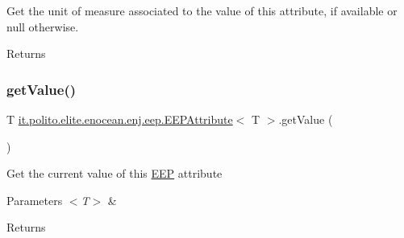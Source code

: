 Get the unit of measure associated to the value of this attribute, if available or null otherwise.

\begin{DoxyReturn}{Returns}

\end{DoxyReturn}
\hypertarget{classit_1_1polito_1_1elite_1_1enocean_1_1enj_1_1eep_1_1_e_e_p_attribute_a4e681931c6ba79eec202bb2fcb34f1ac}{}\label{classit_1_1polito_1_1elite_1_1enocean_1_1enj_1_1eep_1_1_e_e_p_attribute_a4e681931c6ba79eec202bb2fcb34f1ac} 
\subsubsection{\texorpdfstring{get\+Value()}{getValue()}}
{\footnotesize\ttfamily T \hyperlink{classit_1_1polito_1_1elite_1_1enocean_1_1enj_1_1eep_1_1_e_e_p_attribute}{it.\+polito.\+elite.\+enocean.\+enj.\+eep.\+E\+E\+P\+Attribute}$<$ T $>$.get\+Value (\begin{DoxyParamCaption}{ }\end{DoxyParamCaption})}

Get the current value of this \hyperlink{classit_1_1polito_1_1elite_1_1enocean_1_1enj_1_1eep_1_1_e_e_p}{E\+EP} attribute


\begin{DoxyParams}{Parameters}
{\em $<$\+T$>$} & \\
\hline
\end{DoxyParams}
\begin{DoxyReturn}{Returns}

\end{DoxyReturn}
\hypertarget{classit_1_1polito_1_1elite_1_1enocean_1_1enj_1_1eep_1_1_e_e_p_attribute_ae3c284089a4cc226b48fa283068d42cf}{}\label{classit_1_1polito_1_1elite_1_1enocean_1_1enj_1_1eep_1_1_e_e_p_attribute_ae3c284089a4cc226b48fa283068d42cf} 
